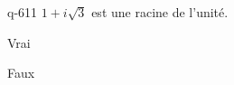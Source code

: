 \begin{truefalse}{q-611}
$1+i\sqrt 3$ est une racine de l'unité.
\item Vrai
\item* Faux
\end{truefalse}

